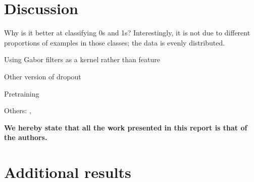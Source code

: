\documentclass{acm_proc_article-sp}
\begin{document}
\section{Discussion}%
Why is it better at classifying 0s and 1s? Interestingly, it is not due to different proportions of examples in those classes; the data is evenly distributed.

Using Gabor filters as a kernel rather than feature \cite{Sabri}

Other version of dropout \cite{Wan}

Pretraining \cite{Erhan}

Others: \cite{Rowley}, \cite{Simard}

{\bfseries We hereby state that all the work presented in this report is that of the authors.}




\appendix
\label{appendix}

\section{Additional results}
\label{sec:additional-results}
\end{document}
